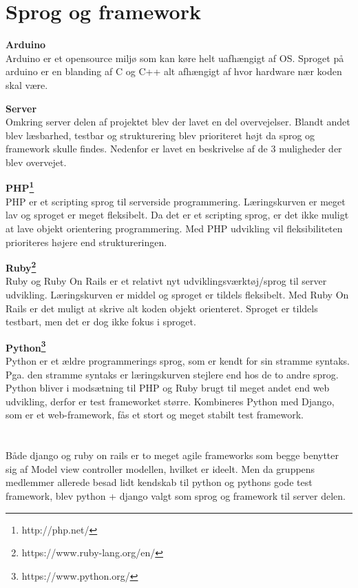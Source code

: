 \section{Sprog og framework}

\textbf{{\LARGE Arduino}} \\
Arduino er et opensource miljø som kan køre helt uafhængigt af OS. Sproget på arduino er en blanding af C og C++ alt afhængigt af hvor hardware nær koden skal være. \newline

\textbf{{\LARGE Server}} \\
Omkring server delen af projektet blev der lavet en del overvejelser. Blandt andet blev læsbarhed, testbar og strukturering blev prioriteret højt da sprog og framework skulle findes. Nedenfor er lavet en beskrivelse af de 3 muligheder der blev overvejet. \newline

\textbf{PHP\footnote{http://php.net/}}\\
PHP er et scripting sprog til serverside programmering. Læringskurven er meget lav og sproget er meget fleksibelt. Da det er et scripting sprog, er det ikke muligt at lave objekt orientering programmering. Med PHP udvikling  vil fleksibiliteten prioriteres højere end struktureringen.

\textbf{Ruby\footnote{https://www.ruby-lang.org/en/}} \\
Ruby og Ruby On Rails er et relativt nyt udviklingsværktøj/sprog til server udvikling. Læringskurven er middel og sproget er tildels fleksibelt. Med Ruby On Rails er det muligt at skrive alt koden objekt orienteret. Sproget er tildels testbart, men det er dog ikke fokus i sproget. 

\textbf{Python\footnote{https://www.python.org/}} \\
Python er et ældre programmerings sprog, som er kendt for sin stramme syntaks. Pga. den stramme syntaks er læringskurven stejlere end hos de to andre sprog.
Python bliver i modsætning til PHP og Ruby brugt til meget andet end web udvikling, derfor er test frameworket større. Kombineres Python med Django, som er et web-framework, fås et stort og meget stabilt test framework. \\ \\ \\

Både django og ruby on rails er to meget agile frameworks som begge benytter sig af Model view controller modellen, hvilket er ideelt. Men da gruppens medlemmer allerede besad lidt kendskab til python og pythons gode test framework, blev python + django valgt som sprog og framework til server delen.

